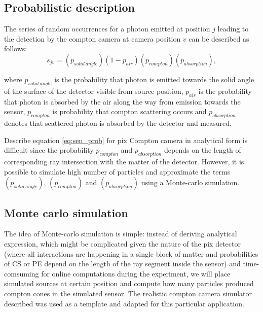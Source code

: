 \subsection{Probabilistic description}%

The series of random occurrences for a photon emitted at position $j$ leading to the detection by the compton camera at camera position $v$ can be described as follows:
\begin{equation}
  s_{jv} =  (p_{solid\ angle})(1-p_{air})(p_{compton})(p_{absorption}),
  \label{eq:sen_prob}
\end{equation}

where $p_{solid\ angle}$ is the probability that photon is emitted towards the solid angle of the surface of the detector visible from source position, 
$p_{air}$ is the probability that photon is absorbed by the air along the way from emission towards the sensor, 
$p_{compton}$ is probability that compton scattering occurs and $p_{absorption}$ denotes that scattered photon is absorbed by the detector and measured.

Describe equation \ref{eq:sen_prob} for \ac{pix} Compton camera in analytical form is difficult since the probability $p_{compton}$ and $p_{absorption}$ depends on the length of corresponding ray intersection with the matter of the detector.  
However, it is possible to simulate high number of particles and approximate the terms $(p_{solid\ angle})$, $(p_{compton})$ and $(p_{absorption})$ using a Monte-carlo simulation.%

\subsection{Monte carlo simulation}%
The idea of Monte-carlo simulation is simple:
instead of deriving analytical expression,
which might be complicated given the nature of the \ac{pix} detector (where all interactions are happening in a single block of matter and probabilities of \ac{CS} or \ac{PE} depend on the length of the ray segment inside the sensor) and time-comsuming for online computations during the experiment,
we will place simulated sources at certain position and compute how many particles produced compton cones in the simulated sensor.
The realistic compton camera simulator described \cite{baca2019timepix} was used as a template and adapted for this particular application.



